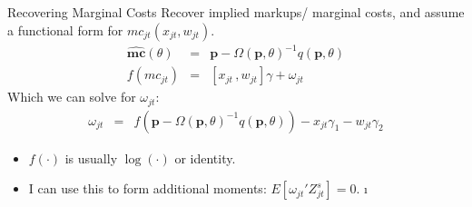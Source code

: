 \documentclass[xcolor=pdftex,dvipsnames,table,mathserif,aspectratio=169]{beamer}
\begin{document}
\begin{frame}{Recovering Marginal Costs }
Recover implied markups/ marginal costs, and assume a functional form for $mc_{jt}(x_{jt},w_{jt})$.
\begin{eqnarray*}
\widehat{\mathbf{mc}}(\theta)&=& \mathbf{p}- \Omega(\mathbf{p},\theta)^{-1} q(\mathbf{p},\theta)\\
f(mc_{jt}) &=& [x_{jt} \,, w_{jt}] \gamma + \omega_{jt}
\end{eqnarray*}
Which we can solve for $\omega_{jt}$:
\begin{eqnarray*}
\omega_{jt} &=&  f(\mathbf{p}- \Omega(\mathbf{p},\theta)^{-1} q(\mathbf{p},\theta)) - x_{jt} \gamma_1 - w_{jt} \gamma_2
\end{eqnarray*}
\begin{itemize}
\item $f(\cdot)$ is usually $\log(\cdot)$ or identity.
\item I can use this to form additional moments: $E[\omega_{jt}' Z_{jt}^{s}]=0$.
\i%
\end{itemize}
\end{frame}
\end{document}
